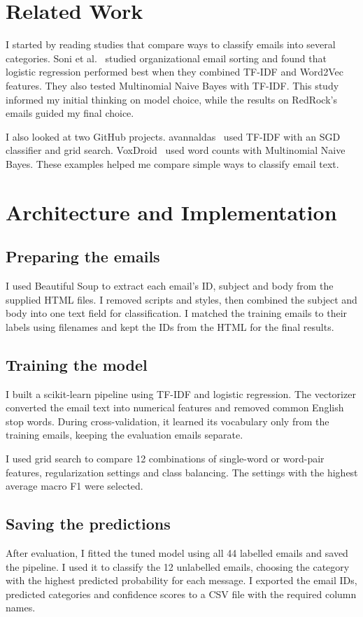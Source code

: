 \documentclass[conference]{IEEEtran}
\begin{document}
\section{Related Work}
I started by reading studies that compare ways to classify emails into several categories. Soni et al.~\cite{soni2024} studied organizational email sorting and found that logistic regression performed best when they combined TF-IDF and Word2Vec features. They also tested Multinomial Naive Bayes with TF-IDF. This study informed my initial thinking on model choice, while the results on RedRock's emails guided my final choice.

I also looked at two GitHub projects. avannaldas~\cite{avannaldas} used TF-IDF with an SGD classifier and grid search. VoxDroid~\cite{voxdroid} used word counts with Multinomial Naive Bayes. These examples helped me compare simple ways to classify email text.

\section{Architecture and Implementation}

\subsection{Preparing the emails}
I used Beautiful Soup to extract each email's ID, subject and body from the supplied HTML files. I removed scripts and styles, then combined the subject and body into one text field for classification. I matched the training emails to their labels using filenames and kept the IDs from the HTML for the final results.

\subsection{Training the model}
I built a scikit-learn pipeline using TF-IDF and logistic regression. The vectorizer converted the email text into numerical features and removed common English stop words. During cross-validation, it learned its vocabulary only from the training emails, keeping the evaluation emails separate.

I used grid search to compare 12 combinations of single-word or word-pair features, regularization settings and class balancing. The settings with the highest average macro F1 were selected.

\subsection{Saving the predictions}
After evaluation, I fitted the tuned model using all 44 labelled emails and saved the pipeline. I used it to classify the 12 unlabelled emails, choosing the category with the highest predicted probability for each message. I exported the email IDs, predicted categories and confidence scores to a CSV file with the required column names.
\end{document}
